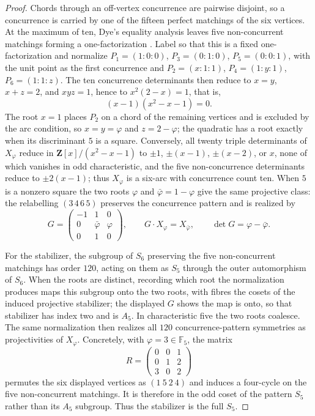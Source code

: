 \documentclass[11pt]{article}
\theoremstyle{definition}
\theoremstyle{remark}
\newcommand{\F}{\mathbb{F}}
\newcommand{\A}{A_5}
\begin{document}
\begin{proof}
Chords through an off-vertex concurrence are pairwise disjoint, so a
concurrence is carried by one of the fifteen perfect matchings of the six
vertices.  At the maximum of ten, Dye's equality analysis leaves five
non-concurrent matchings forming a one-factorization
\cite[\S2.2, pp.~274--275]{Dye1991}.  Label so that this is a fixed
one-factorization and normalize
$P_1=(1{:}0{:}0)$, $P_3=(0{:}1{:}0)$, $P_5=(0{:}0{:}1)$, with the unit
point as the first concurrence and
$P_2=(x{:}1{:}1)$, $P_4=(1{:}y{:}1)$, $P_6=(1{:}1{:}z)$.  The ten
concurrence determinants then reduce to $x=y$, $x+z=2$, and $xyz=1$, hence
to $x^2(2-x)=1$, that is,
\[
 (x-1)(x^2-x-1)=0.
\]
The root $x=1$ places $P_2$ on a chord of the remaining vertices and is
excluded by the arc condition, so $x=y=\varphi$ and $z=2-\varphi$; the
quadratic has a root exactly when its discriminant $5$ is a square.
Conversely, all twenty triple determinants of $X_\varphi$ reduce in
$\mathbf Z[x]/(x^2-x-1)$ to $\pm1$, $\pm(x-1)$, $\pm(x-2)$, or $x$, none of
which vanishes in odd characteristic, and the five non-concurrence
determinants reduce to $\pm2(x-1)$; thus $X_\varphi$ is a six-arc with
concurrence count ten.  When $5$ is a nonzero square the two roots
$\varphi$ and $\bar\varphi=1-\varphi$ give the same projective class: the
relabelling $(3\,4\,6\,5)$ preserves the concurrence pattern and is
realized by
\[
 G=\begin{pmatrix}-1&1&0\\0&\bar\varphi&\varphi\\0&1&0\end{pmatrix},
 \qquad G\cdot X_\varphi=X_{\bar\varphi},
 \qquad\det G=\varphi-\bar\varphi.
\]

For the stabilizer, the subgroup of $S_6$ preserving the five
non-concurrent matchings has order $120$, acting on them as $S_5$ through
the outer automorphism of $S_6$.  When the roots are distinct, recording
which root the normalization produces maps this subgroup onto the two
roots, with fibres the cosets of the induced projective stabilizer; the
displayed $G$ shows the map is onto, so that stabilizer has index two and is
$\A$.  In characteristic five the two roots coalesce.  The same
normalization then realizes all $120$ concurrence-pattern symmetries as
projectivities of $X_\varphi$. Concretely, with $\varphi=3\in\F_5$, the
matrix
\[
 R=\begin{pmatrix}0&0&1\\0&1&2\\3&0&2\end{pmatrix}
\]
permutes the six displayed vertices as $(1\ 5\ 2\ 4)$ and induces a
four-cycle on the five non-concurrent matchings. It is therefore in the odd
coset of the pattern $S_5$ rather than its $A_5$ subgroup. Thus the
stabilizer is the full $S_5$.


\end{proof}
\end{document}

